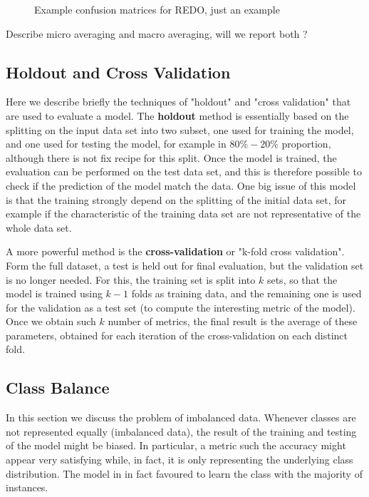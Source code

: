 \documentclass{article}
\begin{document}
\begin{figure}[h!]
\begin{minipage}[b]{0.49\textwidth}
	\end{minipage}

	\caption{Example confusion matrices for {\color{red} REDO, just an example }  }
	\label{confusion_matrices}
\end{figure}


{\color{red} Describe micro averaging and macro averaging, will we report both ? }


\subsection{Holdout and Cross Validation}
Here we describe briefly the techniques of "holdout" and "cross validation" that are used to evaluate a model. The \textbf{holdout} method is essentially based on the splitting on the input data set into two subset, one used for training the model, and one used for testing the model, for example in $80\%-20\%$ proportion, although there is not fix recipe for this split. Once the model is trained, the evaluation can be performed on the test data set, and this is therefore possible to check if the prediction of the model match the data. One big issue of this model is that the training strongly depend on the splitting of the initial data set, for example if the characteristic of the training data set are not representative of the whole data set.

A more powerful method is the \textbf{cross-validation} or "k-fold cross validation". Form the full dataset, a test is held out for final evaluation, but the validation set is no longer needed. For this, the training set is split into $k$ sets, so that the model is trained using $k-1$ folds as training data, and the remaining one is used for the validation as a test set (to compute the interesting metric of the model).
Once we obtain such $k$ number of metrics, the final result is the average of these parameters, obtained for each iteration of the cross-validation on each distinct fold.

\subsection{Class Balance}\label{sec:balance}
In this section we discuss the problem of imbalanced data. Whenever classes are not represented equally (imbalanced data), the result of the training and testing of the model might be biased. In particular, a metric such the accuracy might appear very satisfying while, in fact, it is only representing the underlying class distribution. The model in in fact favoured to learn the class with the majority of instances.
\end{document}
